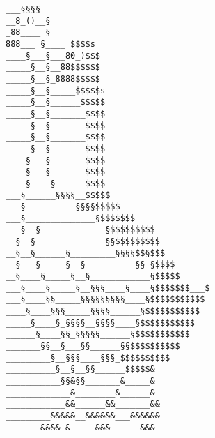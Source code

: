 \documentclass{article}
\begin{document}
\vfill
\centering
\begin{BVerbatim}
___§§§§
__8_()__§
_88____ §
888___ §____ $$$$s
____§___§___80_)$$$
_____§__§__88$$$$$$
_____§__§_8888$$$$$
_____§__§_____$$$$$s
_____§__§______$$$$$
_____§__§_______$$$$
_____§__§_______$$$$
_____§__§_______$$$$
_____§__§_______$$$$
____§___§_______$$$$
____§___§_______$$$$
____§____§______$$$$
___§______§§§§__$$$$$
___§__________§§§§$$$$$
___§______________§$$$$$$$
__ §_ §_____________§$$$$$$$$$
__§__§______________§§$$$$$$$$$
__§__§______§_________§§§§$$§$$$
__§___§_____§__§__________§§_§$$$$
__§____§_____§__§____________§$$$$$
___§____§_____§__§§§____§____§$$$$$$$___$
___§____§§_____§§§§§§§§§____§$$$$$$$$$$$
____§____§§§_____§§§§______§$$$$$$$$$$$
_____§____§_§§§§__§§§§____§$$$$$$$$$$$
______§____§§_§§§§§______§$$$$$$$$$$$
_______§§__§___§§______§§$$$$$$$$$$
_________§__§§§____§§§_$$$$$$$$$$
__________§__§__§§______$$$$$&
___________§§&§§_______&_____&
_____________&________&______&
____________&&______&&_______&&
_________&&&&&__&&&&&&___&&&&&&
_______&&&&_&_____&&&______&&&
\end{BVerbatim}
\end{document}
